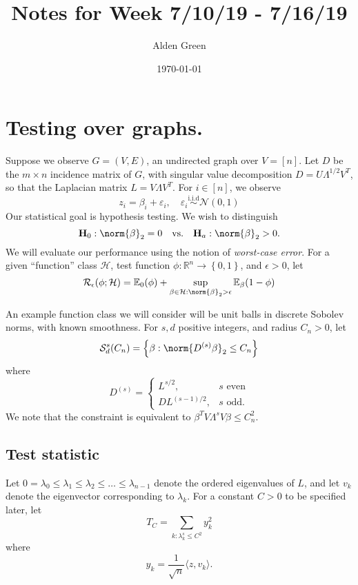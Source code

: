 \documentclass{article}
\newcommand{\Reals}{\mathbb{R}}
\newcommand{\set}[1]{\left\{#1\right\}}
\newcommand{\dotp}[2]{\langle #1, #2 \rangle}
\newcommand{\1}{\mathbb{I}}
\newcommand{\Ebb}{\mathbb{E}}
\theoremstyle{alden}
\theoremstyle{aldenthm}
\theoremstyle{definition}
\theoremstyle{remark}
\begin{document}
\title{Notes for Week 7/10/19 - 7/16/19}
\author{Alden Green}
\date{\today}
\maketitle

\section{Testing over graphs.}

Suppose we observe $G = (V,E)$, an undirected graph over $V = [n]$. Let $D$ be the $m \times n$ incidence matrix of $G$, with singular value decomposition $D = U\Lambda^{1/2}V^T$, so that the Laplacian matrix $L = V \Lambda V^T$. For $i \in [n]$, we observe
\begin{equation*}
z_i = \beta_i + \varepsilon_i, \quad \varepsilon_i \overset{\textrm{i.i.d}}{\sim} \mathcal{N}(0,1)
\end{equation*}
Our statistical goal is hypothesis testing. We wish to distinguish
\begin{equation*}
\mathbf{H}_0: \norm{\beta}_2 = 0 \quad \textrm{vs.} \quad \mathbf{H}_a: \norm{\beta}_2 > 0.
\end{equation*}
We will evaluate our performance using the notion of \emph{worst-case error}. For a given ``function'' class $\mathcal{H}$, test function $\phi: \Reals^n \to \set{0,1}$, and $\epsilon > 0$, let
\begin{equation*}
\mathcal{R}_{\epsilon}(\phi;\mathcal{H})= \Ebb_{0}(\phi) + \sup_{\beta \in \mathcal{H}:\norm{\beta}_2 > \epsilon} \Ebb_{\beta}(1 - \phi)
\end{equation*}

An example function class we will consider will be unit balls in discrete Sobolev norms, with known smoothness. For $s,d$ positive integers, and radius $C_n > 0$, let
\begin{equation*}
\mathcal{S}^{s}_{d}(C_n) = \set{\beta: \norm{D^{(s)}\beta}_2 \leq C_n}
\end{equation*}
where
\begin{equation*}
D^{(s)} = 
\begin{cases}
L^{s/2}, & \text{$s$ even} \\
DL^{(s-1)/2}, & \text{$s$ odd}.
\end{cases}
\end{equation*}
We note that the constraint is equivalent to $\beta^T V \Lambda^s V \beta \leq C_n^2$.
\subsection{Test statistic}
Let $0 = \lambda_0 \leq \lambda_1 \leq \lambda_2 \leq \ldots \leq \lambda_{n - 1}$ denote the ordered eigenvalues of $L$, and let $v_k$ denote the eigenvector corresponding to $\lambda_k$. For a constant $C > 0$ to be specified later, let 
\begin{equation*}
T_C = \sum_{k: \lambda_k^{s} \leq C^2} y_k^2
\end{equation*}
where
\begin{equation*}
y_k = \frac{1}{\sqrt{n}} \dotp{z}{v_k}.
\end{equation*}
\end{document}
